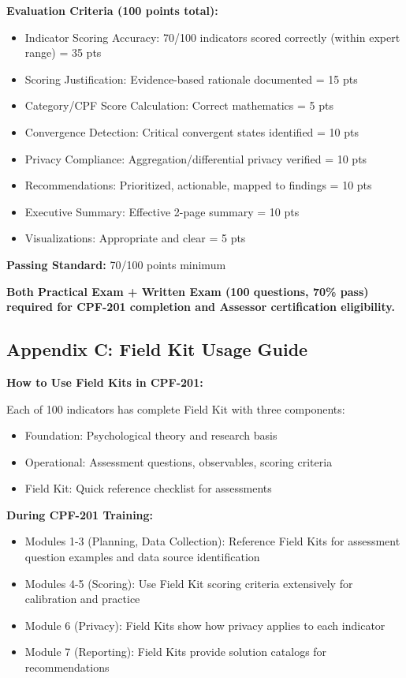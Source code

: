 \documentclass[11pt,a4paper]{article}
\begin{document}
\textbf{Evaluation Criteria (100 points total):}
\begin{itemize}
\item Indicator Scoring Accuracy: 70/100 indicators scored correctly (within expert range) = 35 pts
\item Scoring Justification: Evidence-based rationale documented = 15 pts
\item Category/CPF Score Calculation: Correct mathematics = 5 pts
\item Convergence Detection: Critical convergent states identified = 10 pts
\item Privacy Compliance: Aggregation/differential privacy verified = 10 pts
\item Recommendations: Prioritized, actionable, mapped to findings = 10 pts
\item Executive Summary: Effective 2-page summary = 10 pts
\item Visualizations: Appropriate and clear = 5 pts
\end{itemize}

\textbf{Passing Standard:} 70/100 points minimum

\textbf{Both Practical Exam + Written Exam (100 questions, 70\% pass) required for CPF-201 completion and Assessor certification eligibility.}

\subsection{Appendix C: Field Kit Usage Guide}

\textbf{How to Use Field Kits in CPF-201:}

Each of 100 indicators has complete Field Kit with three components:
\begin{itemize}
\item Foundation: Psychological theory and research basis
\item Operational: Assessment questions, observables, scoring criteria
\item Field Kit: Quick reference checklist for assessments
\end{itemize}

\textbf{During CPF-201 Training:}
\begin{itemize}
\item Modules 1-3 (Planning, Data Collection): Reference Field Kits for assessment question examples and data source identification
\item Modules 4-5 (Scoring): Use Field Kit scoring criteria extensively for calibration and practice
\item Module 6 (Privacy): Field Kits show how privacy applies to each indicator
\item Module 7 (Reporting): Field Kits provide solution catalogs for recommendations
\end{itemize}
\end{document}
